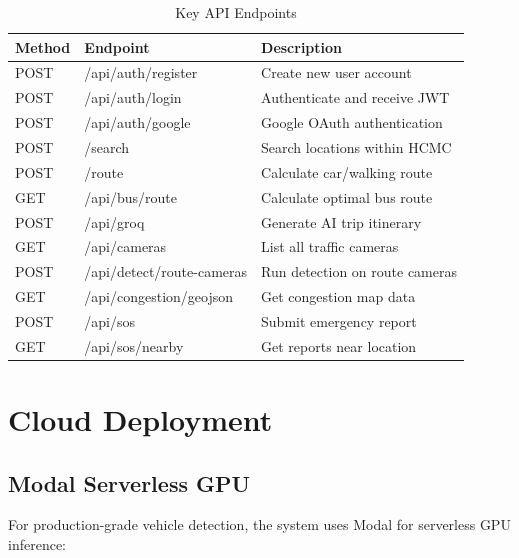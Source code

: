 \begin{table}[H]
    \centering
    \renewcommand{\arraystretch}{1.2}
    \footnotesize
    \begin{tabularx}{\textwidth}{|p{1.2cm}|p{4.5cm}|X|}
        \hline
        \textbf{Method} & \textbf{Endpoint} & \textbf{Description} \\
        \hline
        POST & /api/auth/register & Create new user account \\
        \hline
        POST & /api/auth/login & Authenticate and receive JWT \\
        \hline
        POST & /api/auth/google & Google OAuth authentication \\
        \hline
        POST & /search & Search locations within HCMC \\
        \hline
        POST & /route & Calculate car/walking route \\
        \hline
        GET & /api/bus/route & Calculate optimal bus route \\
        \hline
        POST & /api/groq & Generate AI trip itinerary \\
        \hline
        GET & /api/cameras & List all traffic cameras \\
        \hline
        POST & /api/detect/route-cameras & Run detection on route cameras \\
        \hline
        GET & /api/congestion/geojson & Get congestion map data \\
        \hline
        POST & /api/sos & Submit emergency report \\
        \hline
        GET & /api/sos/nearby & Get reports near location \\
        \hline
    \end{tabularx}
    \caption{Key API Endpoints}
    \label{tab:api-endpoints}
\end{table}

\section{Cloud Deployment}

\subsection{Modal Serverless GPU}

For production-grade vehicle detection, the system uses Modal for serverless GPU inference:

